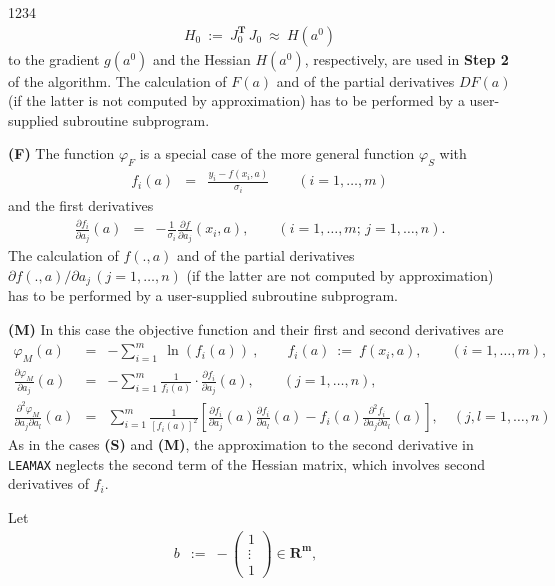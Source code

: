 \begin{DL}{1234}
\begin{eqnarray*}
H_0 \ := \ J_0^{\mathbf{T}}\,J_0 \ \approx \ H(a^0)
\end{eqnarray*}
to the gradient $g(a^0)$ and the Hessian $H(a^0)$, respectively, are
used in {\bf Step 2} of the algorithm.
The calculation of $F(a)$ and of the partial derivatives
$DF(a)$ (if the latter is not computed by approximation) has to
be performed by a user-supplied subroutine subprogram.
\item[{\bf (F)}]
The function $\varphi_F$ is a special case of the more general function
$\varphi_S$ with
\begin{eqnarray*}
f_i(a) & = & \frac{y_i - f(x_i,a)}{\sigma_i} \qquad (i=1,\ldots,m)
\end{eqnarray*}
and the first derivatives
\begin{eqnarray*}
\frac{\partial f_i}{\partial a_j}(a) & = & -\frac{1}{\sigma_i}
\frac{\partial f}{\partial a_j}(x_i,a),
\qquad (i=1,\ldots,m;\,j=1,\ldots,n).
\end{eqnarray*}
The calculation of $f(.,a)$ and of the partial derivatives
$\partial f(.,a)/\partial a_j\, (j=1,\ldots,n)$ (if the latter are not
computed by approximation) has to
be performed by a user-supplied subroutine subprogram.
\item[{\bf (M)}]
In this case the objective function and their first and second
derivatives are
\begin{eqnarray*}
\varphi_M(a) & = & -\sum_{i=1}^m\:\ln(f_i(a))\:,
\qquad f_i(a) \ := \ f(x_i,a),\qquad (i=1,\ldots,m), \\[2mm]
\frac{\partial \varphi_M}{\partial a_j}(a) & = &-\sum_{i=1}^m
\frac{1}{f_i(a)} \cdot
\frac{\partial f_i}{\partial a_j}(a), \qquad (j=1,\ldots,n), \\[2mm]
\frac{\partial^2 \varphi_M}{\partial a_j \partial a_l} (a) & = &
\sum_{i=1}^m \frac{1}{[f_i(a)]^2}
\left[ \frac{\partial f_i}{\partial a_j} (a)
\frac{\partial f_i}{\partial a_l} (a) - f_i(a)
\frac{\partial^2 f_i}{\partial a_j \partial a_l} (a) \right], \quad
(j,l=1,\ldots,n)
\end{eqnarray*}
As in the cases {\bf (S)} and {\bf (M)}, the approximation to the second
derivative in {\tt LEAMAX} neglects the
second term of the Hessian matrix,
which involves second derivatives of $f_i$.
\par
Let
\begin{eqnarray*}
 b & := & -\,\left(\begin{array}{c}
 1 \\ \vdots \\ 1 \end{array} \right) \in \mathbf{R^m}, \qquad

\end{eqnarray*}
\end{DL}
